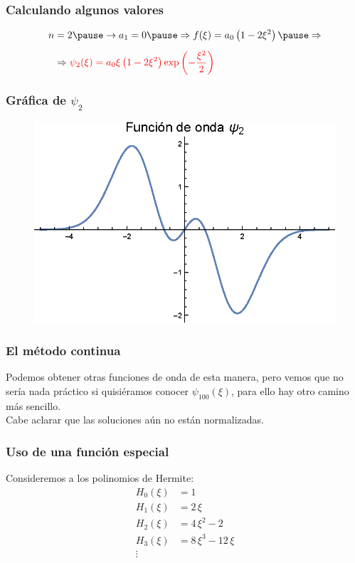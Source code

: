 \documentclass[12pt]{beamer}
\begin{document}
\begin{frame}
\frametitle{Calculando algunos valores}
\begin{eqnarray*}
n &= 2 \pause \rightarrow a_{1} = 0 \pause \Rightarrow f(\xi) = a_{0} \left( 1 - 2 \xi^{2} \right) \pause \Rightarrow \\[0.5em]
&\Rightarrow \textcolor{red}{\psi_{2}(\xi) = a_{0} \xi \left( 1 - 2 \xi^{2} \right) \exp \left( - \dfrac{\xi^{2}}{2} \right)}
\end{eqnarray*}
\end{frame}
\begin{frame}
\frametitle{Gráfica de $\psi_{2}$}
\begin{figure}
    \centering
    \includegraphics[scale=1]{Imagenes/Funcion_Onda_Psi_2.eps}
\end{figure}
\end{frame}
\begin{frame}
\frametitle{El método continua}
Podemos obtener otras funciones de onda de esta manera, \pause pero vemos que no sería nada práctico si quisiéramos conocer $\psi_{100}(\xi)$, para ello hay otro camino más sencillo.
\\
\bigskip
\pause
Cabe aclarar que las soluciones aún no están normalizadas.
\end{frame}
\begin{frame}
\frametitle{Uso de una función especial}
Consideremos a los polinomios de Hermite:
\pause
\begin{align*}
H_{0}(\xi) &= 1 \\[0.5em]
H_{1}(\xi) &= 2 \, \xi \\[0.5em]
H_{2}(\xi) &= 4 \, \xi^{2} - 2 \\[0.5em]
H_{3}(\xi) &= 8 \, \xi^{3} - 12 \, \xi \\[0.5em]
\vdots
\end{align*}
\end{frame}
\end{document}
